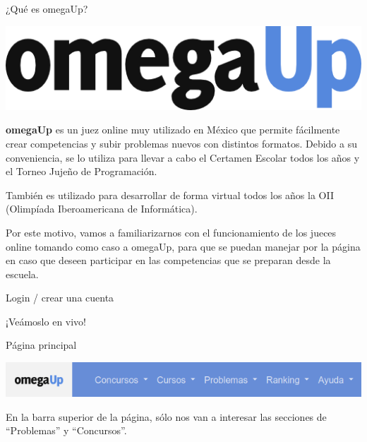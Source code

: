 \documentclass{beamer}
\begin{document}
    \begin{frame}{¿Qué es omegaUp?}
        \begin{center}
            \includegraphics[width=.4\linewidth]{./omegaup_curves.png}
        \end{center}\pause

        \textbf{omegaUp} es un juez online muy utilizado en México que permite fácilmente crear competencias y subir problemas nuevos con distintos formatos. Debido a su conveniencia, se lo utiliza para llevar a cabo el Certamen Escolar todos los años y el Torneo Jujeño de Programación. \pause

        También es utilizado para desarrollar de forma virtual todos los años la OII (Olimpíada Iberoamericana de Informática). \pause \vspace{4pt}

        Por este motivo, vamos a familiarizarnos con el funcionamiento de los jueces online tomando como caso a omegaUp, para que se puedan manejar por la página en caso que deseen participar en las competencias que se preparan desde la escuela.
    \end{frame}

    \begin{frame}{Login / crear una cuenta}
        \begin{center}
            \LARGE¡Veámoslo en vivo!
        \end{center}
    \end{frame}

    \begin{frame}{Página principal}
        \begin{center}
            \includegraphics[width=.8\linewidth]{./ou_topbar.png}
        \end{center} \pause
        En la barra superior de la página, sólo nos van a interesar las secciones de ``Problemas'' y ``Concursos''.
    \end{frame}
\end{document}
